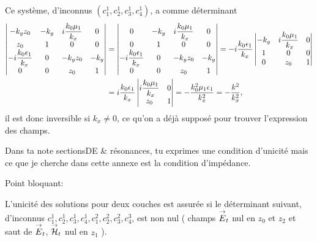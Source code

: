 {\begin{itshape}
  Ce système, d'inconnus \((c_1^1,c_2^1,c_3^1,c_4^1)\), a comme déterminant 
  \begin{align*}
  \begin{vmatrix}
   -{k_y}z_0 &  -{k_y} & i\dfrac{k_0\mu_1}{k_x} & 0
  \\
  z_0 & 1 & 0 & 0
  \\
 -i\dfrac{k_0\epsilon_1}{k_x} & 0 & -{k_y}z_0 & -{k_y}
  \\
  0 & 0 & z_0 & 1 
  \end{vmatrix}  &= 
  \begin{vmatrix}
  0 &  -{k_y} & i\dfrac{k_0\mu_1}{k_x} & 0
  \\
  0 & 1 & 0 & 0
  \\
 -i\dfrac{k_0\epsilon_1}{k_x} & 0 & -{k_y}z_0 & -{k_y}
  \\
  0 & 0 & z_0 & 1 
  \end{vmatrix} = -i\dfrac{k_0\epsilon_1}{k_x}
  \begin{vmatrix}
  -{k_y} & i\dfrac{k_0\mu_1}{k_x} & 0
  \\
  1 & 0 & 0
  \\
  0 & z_0 & 1 
  \end{vmatrix}
  \\
  & = i\dfrac{k_0\epsilon_1}{k_x}
  \begin{vmatrix}
  i\dfrac{k_0\mu_1}{k_x} & 0
  \\
  z_0 & 1 
  \end{vmatrix} = -\dfrac{k_0^2\mu_1\epsilon_1}{k_x^2} = -\dfrac{k^2}{k_x^2},
  \end{align*}
  il est donc inversible si \(k_x\not=0\), ce qu'on a déjà supposé pour trouver l'expression des champs.

  Dans ta note sectionsDE \& résonances, tu exprimes une condition d'unicité mais ce que je cherche dans cette annexe est la condition d'impédance.


  Point bloquant:

  L'unicité des solutions pour deux couches est assurée si le déterminant suivant, d'inconnus  \(
  c_1^1, c_2^1, c_3^1, c_4^1, c_1^2, c_2^2, c_3^2, c_4^3
  \), est non nul ( champs \({\overset{\rightarrow}{E}}_t\) nul en \(z_0\) et \(z_2\) et saut de \({\overset{\rightarrow}{E}}_t\), \({\overset{\rightarrow}{\mathcal{H}}}_t\) nul en \(z_1\) ).


\end{itshape}}
